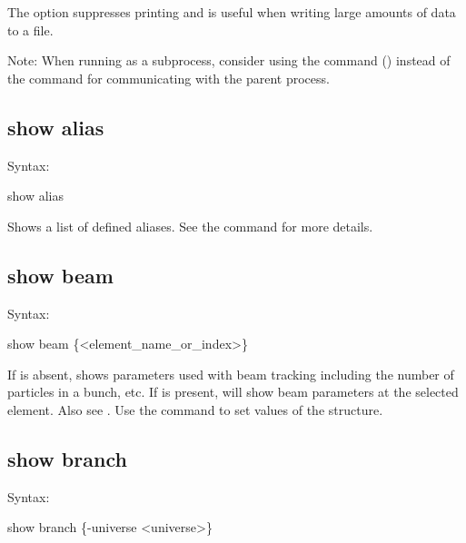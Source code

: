 {{{{{The  option suppresses printing and is useful when writing large amounts of
data to a file.

Note: When running \tao as a subprocess, consider using the  command
() instead of the  command for communicating with the parent
process.



\subsection{show alias}
\label{s:show.alias}

Syntax:
\begin{example}
  show alias
\end{example}

Shows a list of defined aliases. See the  command for more details.


\subsection{show beam}
\label{s:show.beam}

Syntax:
\begin{example}
  show beam \{<element_name_or_index>\}
\end{example}

If  is absent,  shows parameters used with beam
tracking including the number of particles in a bunch, etc.  If
 is present,  will show beam parameters at the
selected element. Also see .  Use the  command to set
values of the  structure.


\subsection{show branch}
\label{s:show.branch}

Syntax:
\begin{example}
  show branch \{-universe <universe>\}
\end{example}


}}}}}
